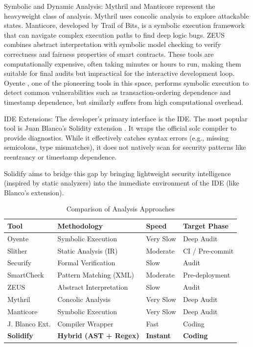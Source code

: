 \documentclass[10pt, a4paper]{article}
\begin{document}
Symbolic and Dynamic Analysis: Mythril \cite{mueller2018} and Manticore \cite{mossberg2018} represent the heavyweight class of analysis. Mythril uses concolic analysis to explore attackable states. Manticore, developed by Trail of Bits, is a symbolic execution framework that can navigate complex execution paths to find deep logic bugs. ZEUS \cite{kalra2018} combines abstract interpretation with symbolic model checking to verify correctness and fairness properties of smart contracts. These tools are computationally expensive, often taking minutes or hours to run, making them suitable for final audits but impractical for the interactive development loop. Oyente \cite{luu2016}, one of the pioneering tools in this space, performs symbolic execution to detect common vulnerabilities such as transaction-ordering dependence and timestamp dependence, but similarly suffers from high computational overhead.

IDE Extensions: The developer's primary interface is the IDE. The most popular tool is Juan Blanco's Solidity extension \cite{blanco2016}. It wraps the official solc compiler to provide diagnostics. While it effectively catches syntax errors (e.g., missing semicolons, type mismatches), it does not natively scan for security patterns like reentrancy or timestamp dependence.

Solidify aims to bridge this gap by bringing lightweight security intelligence (inspired by static analyzers) into the immediate environment of the IDE (like Blanco's extension).

\begin{table}[H]
    \centering
    \caption{Comparison of Analysis Approaches}
    \label{tab:related_work_comparison}
    \begin{tabularx}{\textwidth}{@{} l >{\raggedright\arraybackslash}X l l @{}}
        \toprule
        \textbf{Tool} & \textbf{Methodology} & \textbf{Speed} & \textbf{Target Phase} \\
        \midrule
        Oyente \cite{luu2016} & Symbolic Execution & Very Slow & Deep Audit \\
        Slither \cite{feist2019} & Static Analysis (IR) & Moderate & CI / Pre-commit \\
        Securify \cite{tsankov2018} & Formal Verification & Slow & Audit \\
        SmartCheck \cite{tikhomirov2018} & Pattern Matching (XML) & Moderate & Pre-deployment \\
        ZEUS \cite{kalra2018} & Abstract Interpretation & Slow & Audit \\
        Mythril \cite{mueller2018} & Concolic Analysis & Very Slow & Deep Audit \\
        Manticore \cite{mossberg2018} & Symbolic Execution & Very Slow & Deep Audit \\
        J. Blanco Ext. \cite{blanco2016} & Compiler Wrapper & Fast & Coding \\
        \midrule
        \textbf{Solidify} & \textbf{Hybrid (AST + Regex)} & \textbf{Instant} & \textbf{Coding} \\
        \bottomrule
    \end{tabularx}
\end{table}
\end{document}
